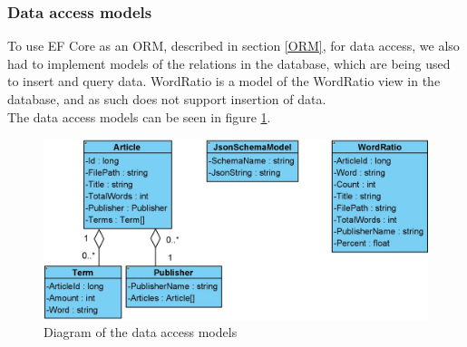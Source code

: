 \subsubsection*{Data access models}
To use EF Core as an ORM, described in section \ref{ORM}, for data access, we also had to implement models of the relations in the database, which are being used to insert and query data. 
WordRatio is a model of the WordRatio view in the database, and as such does not support insertion of data.
\\
The data access models can be seen in figure \ref*{fig:DataAccesModels}. 
\begin{figure}[H]
    \centering
    \includegraphics[scale=0.4]{Images/DataAccessModels.jpg}
    \caption{Diagram of the data access models}
    \label{fig:DataAccesModels}
\end{figure}